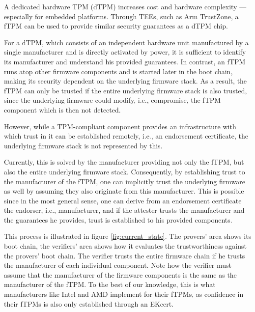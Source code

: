 A dedicated hardware TPM (dTPM) increases cost and hardware complexity --- especially for embedded platforms.
Through \acp{TEE}, such as Arm TrustZone, a \ac{fTPM} can be used to provide similar security guarantees as a dTPM chip.


For a dTPM, which consists of an independent hardware unit manufactured by a single manufacturer and is directly activated by power, it is sufficient to identify its manufacturer and understand his provided guarantees.
In contrast, an \ac{fTPM} runs atop other firmware components and is started later in the boot chain, making its security dependent on the underlying firmware stack.
As a result, the fTPM can only be trusted if the entire underlying firmware stack is also trusted, since the underlying firmware could modify, i.e., compromise, the fTPM component which is then not detected.


However, while a TPM-compliant component provides an infrastructure with which trust in it can be established remotely, i.e., an endorsement certificate, the underlying firmware stack is not represented by this.


Currently, this is solved by the manufacturer providing not only the fTPM, but also the entire underlying firmware stack.
Consequently, by establishing trust to the manufacturer of the fTPM, one can implicitly trust the underlying firmware as well by assuming they also originate from this manufacturer.
This is possible since in the most general sense, one can derive from an endorsement certificate the endorser, i.e., manufacturer, and if the attester trusts the manufacturer and the guarantees he provides, trust is established to his provided components.



This process is illustrated in figure \autoref{fig:current_state}.
The provers' area shows its boot chain, the verifiers' area shows how it evaluates the trustworthiness against the provers' boot chain.
The verifier trusts the entire firmware chain if he trusts the manufacturer of each individual component.
Note how the verifier must assume that the manufacturer of the firmware components is the same as the manufacturer of the fTPM\@.
To the best of our knowledge, this is what manufacturers like Intel and AMD implement for their \acp{fTPM}, as confidence in their \acp{fTPM} is also only established through an EKcert.

